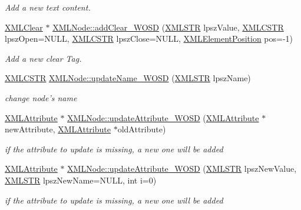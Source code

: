 \begin{DoxyCompactItemize}
\begin{DoxyCompactList}\small\item\em Add a new text content. \end{DoxyCompactList}\item 
\hyperlink{structXMLClear}{X\-M\-L\-Clear} $\ast$ \hyperlink{group__xmlWOSD_ga6d3ed8368db156df576e0c54f5f45d30}{X\-M\-L\-Node\-::add\-Clear\-\_\-\-W\-O\-S\-D} (\hyperlink{xmlParser_8h_a849d96105aa0c8f64b5c10d9151a3cdc}{X\-M\-L\-S\-T\-R} lpsz\-Value, \hyperlink{xmlParser_8h_acdb0d6fd8dd596384b438d86cfb2b182}{X\-M\-L\-C\-S\-T\-R} lpsz\-Open=N\-U\-L\-L, \hyperlink{xmlParser_8h_acdb0d6fd8dd596384b438d86cfb2b182}{X\-M\-L\-C\-S\-T\-R} lpsz\-Close=N\-U\-L\-L, \hyperlink{xmlParser_8h_aab10d65aadeca1f026f6416becde7432}{X\-M\-L\-Element\-Position} pos=-\/1)
\begin{DoxyCompactList}\small\item\em Add a new clear Tag. \end{DoxyCompactList}\item 
\hyperlink{xmlParser_8h_acdb0d6fd8dd596384b438d86cfb2b182}{X\-M\-L\-C\-S\-T\-R} \hyperlink{group__xmlWOSD_ga5f35571651c6b629f5c8e5d02942a1c7}{X\-M\-L\-Node\-::update\-Name\-\_\-\-W\-O\-S\-D} (\hyperlink{xmlParser_8h_a849d96105aa0c8f64b5c10d9151a3cdc}{X\-M\-L\-S\-T\-R} lpsz\-Name)
\begin{DoxyCompactList}\small\item\em change node's name \end{DoxyCompactList}\item 
\hyperlink{structXMLAttribute}{X\-M\-L\-Attribute} $\ast$ \hyperlink{group__xmlWOSD_gaeb6533f46c1dd1843e33653612483a0c}{X\-M\-L\-Node\-::update\-Attribute\-\_\-\-W\-O\-S\-D} (\hyperlink{structXMLAttribute}{X\-M\-L\-Attribute} $\ast$new\-Attribute, \hyperlink{structXMLAttribute}{X\-M\-L\-Attribute} $\ast$old\-Attribute)
\begin{DoxyCompactList}\small\item\em if the attribute to update is missing, a new one will be added \end{DoxyCompactList}\item 
\hyperlink{structXMLAttribute}{X\-M\-L\-Attribute} $\ast$ \hyperlink{group__xmlWOSD_ga695e7ac29591363833575782243eff1b}{X\-M\-L\-Node\-::update\-Attribute\-\_\-\-W\-O\-S\-D} (\hyperlink{xmlParser_8h_a849d96105aa0c8f64b5c10d9151a3cdc}{X\-M\-L\-S\-T\-R} lpsz\-New\-Value, \hyperlink{xmlParser_8h_a849d96105aa0c8f64b5c10d9151a3cdc}{X\-M\-L\-S\-T\-R} lpsz\-New\-Name=N\-U\-L\-L, int i=0)
\begin{DoxyCompactList}\small\item\em if the attribute to update is missing, a new one will be added \end{DoxyCompactList}\item 

\end{DoxyCompactItemize}
